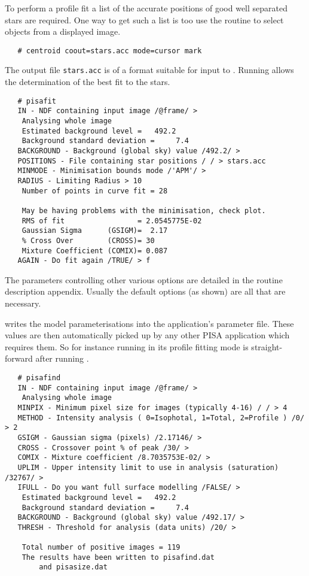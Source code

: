 To perform a profile fit a list of the accurate positions of good well
separated stars are required. One way to get such a list is too use
the  routine to select objects
from a displayed image.
\begin{verbatim}
   # centroid coout=stars.acc mode=cursor mark
\end{verbatim}
The output file \verb+stars.acc+ is of a format suitable for input to
. Running  allows the determination of the
best fit to the stars.
\begin{verbatim}
   # pisafit
   IN - NDF containing input image /@frame/ >
    Analysing whole image
    Estimated background level =   492.2
    Background standard deviation =     7.4
   BACKGROUND - Background (global sky) value /492.2/ >
   POSITIONS - File containing star positions / / > stars.acc
   MINMODE - Minimisation bounds mode /'APM'/ >
   RADIUS - Limiting Radius > 10
    Number of points in curve fit = 28

    May be having problems with the minimisation, check plot.
    RMS of fit                 = 2.0545775E-02
    Gaussian Sigma      (GSIGM)=  2.17
    % Cross Over        (CROSS)= 30
    Mixture Coefficient (COMIX)= 0.087
   AGAIN - Do fit again /TRUE/ > f

\end{verbatim}
The parameters controlling other various options are detailed in the
routine description appendix. Usually the default options (as shown) are
all that are necessary.

 writes the model parameterisations into the
application's parameter file. These values are then automatically
picked up by any other PISA application which requires them. So for
instance running  in its profile fitting mode is
straight-forward after running .
\begin{verbatim}
   # pisafind
   IN - NDF containing input image /@frame/ >
    Analysing whole image
   MINPIX - Minimum pixel size for images (typically 4-16) / / > 4
   METHOD - Intensity analysis ( 0=Isophotal, 1=Total, 2=Profile ) /0/ > 2
   GSIGM - Gaussian sigma (pixels) /2.17146/ >
   CROSS - Crossover point % of peak /30/ >
   COMIX - Mixture coefficient /8.7035753E-02/ >
   UPLIM - Upper intensity limit to use in analysis (saturation) /32767/ >
   IFULL - Do you want full surface modelling /FALSE/ >
    Estimated background level =   492.2
    Background standard deviation =     7.4
   BACKGROUND - Background (global sky) value /492.17/ >
   THRESH - Threshold for analysis (data units) /20/ >

    Total number of positive images = 119
    The results have been written to pisafind.dat
        and pisasize.dat
\end{verbatim}

